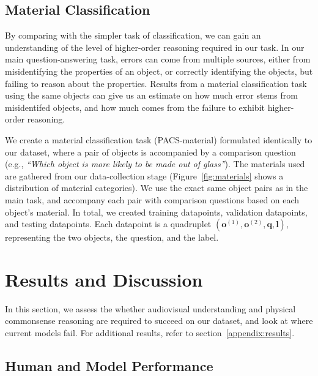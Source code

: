 \documentclass[runningheads]{llncs}
\newcommand{\names}{\textsc{PACS}}
\begin{document}
\subsection{Material Classification} \label{sec:material}


By comparing with the simpler task of classification, we can gain an understanding of the level of higher-order reasoning required in our task. In our main question-answering task, errors can come from multiple sources, either from misidentifying the properties of an object, or correctly identifying the objects, but failing to reason about the properties. Results from a material classification task using the same objects can give us an estimate on how much error stems from misidentifed objects, and how much comes from the failure to exhibit higher-order reasoning.

We create a material classification task (\names-material) formulated identically to our dataset, where a pair of objects is accompanied by a comparison question (e.g., \textit{``Which object is more likely to be made out of glass''}). The materials used are gathered from our data-collection stage (Figure~\ref{fig:materials} shows a distribution of material categories). We use the exact same object pairs as in the main task, and accompany each pair with comparison questions based on each object's material.
In total, we created  training datapoints,  validation datapoints, and  testing datapoints. Each datapoint is a quadruplet $(\boldsymbol{o}^{(1)}, \boldsymbol{o}^{(2)}, \boldsymbol{q}, \boldsymbol{l})$, representing the two objects, the question, and the label.


\section{Results and Discussion}
\label{sec:results}


In this section, we assess the whether audiovisual understanding and physical commonsense reasoning are required to succeed on our dataset, and look at where current models fail. For additional results, refer to section~\ref{appendix:results}. 

\subsection{Human and Model Performance}
\end{document}
